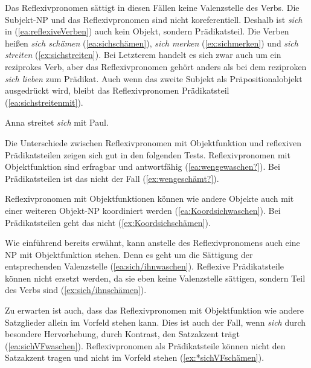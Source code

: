 Das Reflexivpronomen sättigt in diesen Fällen keine Valenzstelle des Verbs. Die Subjekt-NP und das Reflexivpronomen sind nicht koreferentiell. Deshalb ist \textit{sich} in (\ref{ea:reflexiveVerben}) auch kein Objekt, sondern Prädikatsteil. Die Verben heißen \textit{sich schämen} (\ref{ea:sichschämen}), \textit{sich merken} (\ref{ex:sichmerken}) und \textit{sich streiten} (\ref{ex:sichstreiten}). Bei Letzterem handelt es sich zwar auch um ein reziprokes Verb, aber das Reflexivpronomen gehört anders als bei dem reziproken \textit{sich lieben} zum Prädikat. Auch wenn das zweite Subjekt als Präpositionalobjekt ausgedrückt wird, bleibt das Reflexivpronomen Prädikatsteil (\ref{ea:sichstreitenmit}).

\ea \label{ea:sichstreitenmit} Anna streitet \textit{sich} mit Paul.
\z 


Die Unterschiede zwischen Reflexivpronomen mit Objektfunktion und reflexiven Prädikatsteilen zeigen sich gut in den folgenden Tests. Reflexivpronomen mit Objektfunktion sind erfragbar und antwortfähig (\ref{ea:wengewaschen?}). Bei Prädikatsteilen ist das nicht der Fall (\ref{ex:wengeschämt?}).

\largerpage
\ea \label{ea:ReflFrage} 
\label{ea:wengewaschen?}
\label{ex:wengeschämt?}
\z 
\z 

Reflexivpronomen mit Objektfunktionen können wie andere Objekte auch mit einer weiteren Objekt-NP koordiniert werden (\ref{ea:Koordsichwaschen}). Bei Prädikatsteilen geht das nicht (\ref{ex:Koordsichschämen}).

\ea \label{ea:ReflKoord} 
\label{ea:Koordsichwaschen}
\label{ex:Koordsichschämen}
\z 
\z 

Wie einführend bereits erwähnt, kann anstelle des Reflexivpronomens auch eine NP mit Objektfunktion stehen. Denn es geht um die Sättigung der entsprechenden Valenzstelle (\ref{ea:sich/ihnwaschen}). Reflexive Prädikatsteile können nicht ersetzt werden, da sie eben keine Valenzstelle sättigen, sondern Teil des Verbs sind (\ref{ex:sich/ihnschämen}).

\ea \label{ea:ReflErsatz} 
\label{ea:sich/ihnwaschen}
\label{ex:sich/ihnschämen}
\z 
\z 

Zu erwarten ist auch, dass das Reflexivpronomen mit Objektfunktion wie andere Satzglieder allein im Vorfeld stehen kann. Dies ist auch der Fall, wenn \textit{sich} durch besondere Hervorhebung, \zB durch Kontrast, den Satzakzent trägt (\ref{ea:sichVFwaschen}). Reflexivpronomen als Prädikatsteile können nicht den Satzakzent tragen und nicht im Vorfeld stehen (\ref{ex:*sichVFschämen}).

